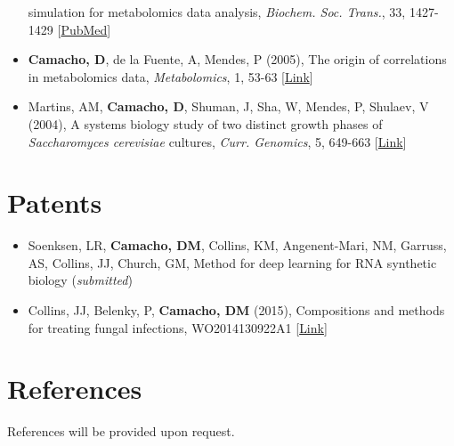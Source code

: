 \documentclass[11pt,a4paper,]{awesome-cv}
\providecommand{\tightlist}{%
	\setlength{\itemsep}{0pt}\setlength{\parskip}{0pt}}
\begin{document}
\begin{itemize}
  simulation for metabolomics data analysis, \emph{Biochem. Soc.
  Trans.}, 33, 1427-1429
  {[}\href{https://www.ncbi.nlm.nih.gov/pubmed/16246137}{PubMed}{]}
\item
  \textbf{Camacho, D}, de la Fuente, A, Mendes, P (2005), The origin of
  correlations in metabolomics data, \emph{Metabolomics}, 1, 53-63
  {[}\href{https://link.springer.com/article/10.1007/s11306-005-1107-3}{Link}{]}
\item
  Martins, AM, \textbf{Camacho, D}, Shuman, J, Sha, W, Mendes, P,
  Shulaev, V (2004), A systems biology study of two distinct growth
  phases of \emph{Saccharomyces cerevisiae} cultures, \emph{Curr.
  Genomics}, 5, 649-663
  {[}\href{https://www.ingentaconnect.com/content/ben/cg/2004/00000005/00000008/art00005}{Link}{]}
\end{itemize}

\hypertarget{patents}{%
\section{Patents}\label{patents}}

\begin{itemize}
\tightlist
\item
  Soenksen, LR, \textbf{Camacho, DM}, Collins, KM, Angenent-Mari, NM,
  Garruss, AS, Collins, JJ, Church, GM, Method for deep learning for RNA
  synthetic biology (\emph{submitted})
\item
  Collins, JJ, Belenky, P, \textbf{Camacho, DM} (2015), Compositions and
  methods for treating fungal infections, WO2014130922A1
  {[}\href{https://patents.google.com/patent/WO2014130922A1/en}{Link}{]}
\end{itemize}

\hypertarget{references}{%
\section{References}\label{references}}

References will be provided upon request.
\end{document}
